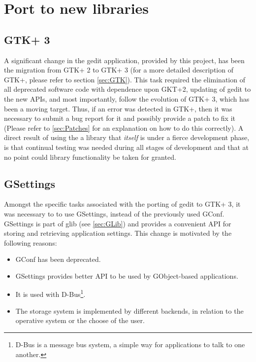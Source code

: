
\section{Port to new libraries}\label{sec:NewLibraries}

\subsection{GTK+ 3}\label{sec:GTK3}

A significant change in the gedit application, provided by this project, has been the migration from GTK+ 2 to GTK+ 3 
(for a more detailed description of GTK+, please refer to section \ref{sec:GTK}).
This task required the elimination of all deprecated software code with dependence upon GKT+2, updating of gedit to the 
new APIs, and most importantly, follow the evolution of GTK+ 3, which has been a moving target.    Thus, if an error was 
detected in GTK+, then it was necessary to submit a bug report for it and possibly provide a patch to fix it (Please 
refer to \ref{sec:Patches} for an explanation on how to do this correctly).   A direct result of using the a library 
that \textit{itself} is under a fierce development phase, is that continual testing was needed during all stages of 
development and that at no point could library functionality be taken for granted.  


\subsection[GSettings]{GSettings\cite{website:gio}}\label{sec:GSettings}

Amongst the specific tasks associated with the porting of gedit to GTK+ 3, it was necessary 
to to use GSettings, instead of the previously used GConf.  GSettings is part of glib (see \ref{sec:GLib}) 
and provides a convenient API for storing and retrieving application settings.   This 
change is motivated by the following reasons: 
\begin{itemize}
  \item GConf has been deprecated.
  \item GSettings provides better API to be used by GObject-based applications.
  \item It is used with D-Bus\footnote{D-Bus is a message bus system, a simple way for applications to talk to one another.}.
  \item The storage system is implemented by different backends, in relation to the operative system or the choose of the user.
\end{itemize}

